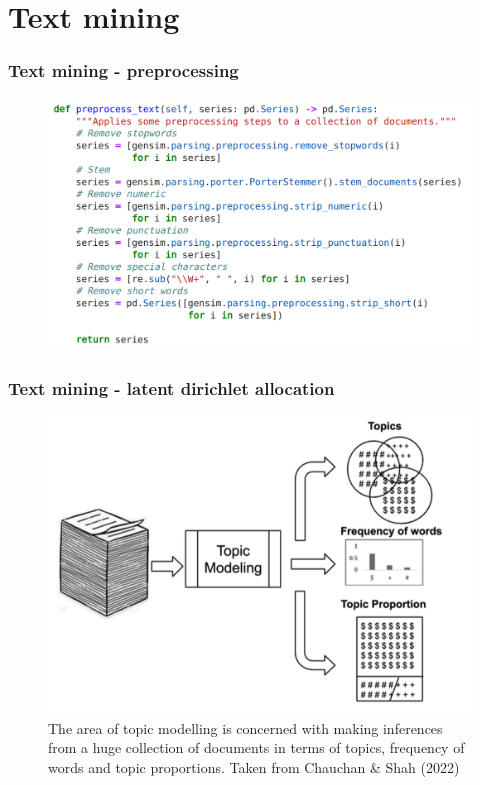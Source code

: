 \documentclass{beamer}
\begin{document}
\section{Text mining}
\begin{frame}
\frametitle{Text mining - preprocessing}

\begin{figure}
\includegraphics[width=0.6\linewidth]{../visualizations/preprocess_text_code.png}
\end{figure}

\end{frame}


\begin{frame}
\frametitle{Text mining - latent dirichlet allocation}

\begin{figure}
\includegraphics[width=0.6\linewidth]{../visualizations/topic_modelling.png}
\caption{The area of topic modelling is concerned with making inferences from a huge collection of documents in terms of topics, frequency of words and topic proportions. Taken from Chauchan \& Shah (2022)}
\end{figure}

\end{frame}
\end{document}
